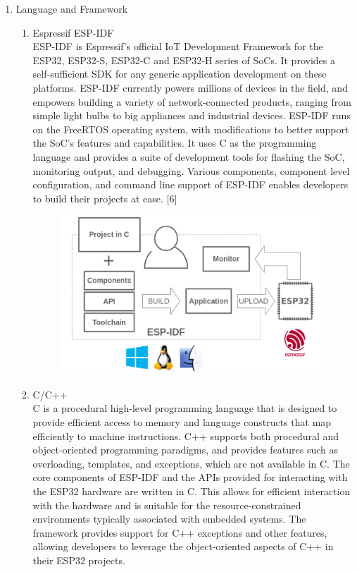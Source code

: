 \documentclass[conference]{IEEEtran}
\begin{document}
\begin{enumerate}[label=\arabic*.]
\item Language and Framework\\
\begin{enumerate}[label=\alph*.]
\item Espressif ESP-IDF\\
ESP-IDF is Espressif’s official IoT Development Framework for the ESP32, ESP32-S, ESP32-C and ESP32-H series of SoCs. It provides a self-sufficient SDK for any generic application development on these platforms. ESP-IDF currently powers millions of devices in the field, and empowers building a variety of network-connected products, ranging from simple light bulbs to big appliances and industrial devices. ESP-IDF runs on the FreeRTOS operating system, with modifications to better support the SoC's features and capabilities. It uses C as the programming language and provides a suite of development tools for flashing the SoC, monitoring output, and debugging. Various components, component level configuration, and command line support of ESP-IDF enables developers to build their projects at ease. [6]\\
\begin{figure}[H]\centering \includegraphics[scale=0.33]{images/esp-idf.png}\end{figure}
\item C/C++\\
C is a procedural high-level programming language that is designed to provide efficient access to memory and language constructs that map efficiently to machine instructions. C++ supports both procedural and object-oriented programming paradigms, and provides features such as overloading, templates, and exceptions, which are not available in C. The core components of ESP-IDF and the APIs provided for interacting with the ESP32 hardware are written in C. This allows for efficient interaction with the hardware and is suitable for the resource-constrained environments typically associated with embedded systems. The framework provides support for C++ exceptions and other features, allowing developers to leverage the object-oriented aspects of C++ in their ESP32 projects.\\

\end{enumerate}
\end{enumerate}
\end{document}
